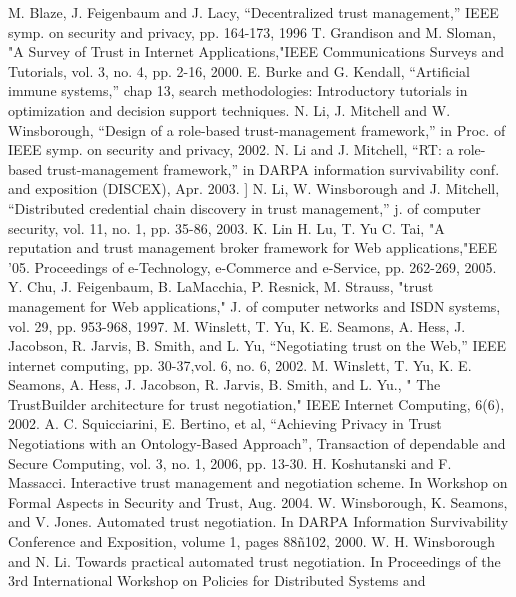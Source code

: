 \documentclass{llncs}
\begin{document}
\begin{thebibliography}{99.}%
 M. Blaze, J. Feigenbaum and J. Lacy, “Decentralized trust management,” IEEE
symp. on security and privacy, pp. 164-173, 1996
T. Grandison and M. Sloman, "A Survey of Trust in Internet Applications,"IEEE Communications Surveys and Tutorials, vol. 3, no. 4, pp. 2-16, 2000.
 E.  Burke and G. Kendall, “Artificial immune systems,”  chap 13,  search methodologies: Introductory tutorials in optimization and decision support techniques. 
N. Li, J. Mitchell and W. Winsborough, “Design of a role-based trust-management
framework,” in Proc. of IEEE symp. on security and privacy, 2002.
 N. Li and J. Mitchell, “RT: a role-based trust-management framework,” in DARPA
information survivability conf. and exposition (DISCEX), Apr. 2003.
 ] N. Li, W. Winsborough and J. Mitchell, “Distributed credential chain discovery in
trust management,” j. of computer security, vol. 11, no. 1, pp. 35-86, 2003.
 K. Lin   H. Lu,   T. Yu   C. Tai, "A reputation and trust management broker framework for Web applications,"EEE '05. Proceedings of e-Technology, e-Commerce and e-Service, pp. 262-269, 2005.
  Y. Chu, J. Feigenbaum, B. LaMacchia,  P. Resnick, M. Strauss, "trust management for Web applications," J. of computer networks and ISDN systems, vol. 29, pp. 953-968, 1997. 
 M. Winslett, T. Yu, K. E. Seamons, A. Hess, J. Jacobson, R. Jarvis, B. Smith, and L.
Yu, “Negotiating trust on the Web,” IEEE internet computing, pp. 30-37,vol. 6, no.
6, 2002.
 M. Winslett, T. Yu, K. E. Seamons, A. Hess, J. Jacobson, 
R. Jarvis, B. Smith, and L. Yu., " The TrustBuilder architecture for trust negotiation," IEEE Internet Computing, 6(6), 2002.
 A. C. Squicciarini, E. Bertino, et al, “Achieving
Privacy in Trust Negotiations with an Ontology-Based
Approach”, Transaction of dependable and Secure
Computing, vol. 3, no. 1, 2006, pp. 13-30.
 H. Koshutanski and F. Massacci. Interactive trust 
management and negotiation scheme. In Workshop on 
Formal Aspects in Security and Trust, Aug. 2004.
 W. Winsborough, K. Seamons, and V. Jones. Automated
trust negotiation. In DARPA Information Survivability Conference
and Exposition, volume 1, pages 88ñ102, 2000.
 W. H. Winsborough and N. Li. Towards practical automated
trust negotiation. In Proceedings of the 3rd International
Workshop on Policies for Distributed Systems and

\end{thebibliography}
\end{document}
